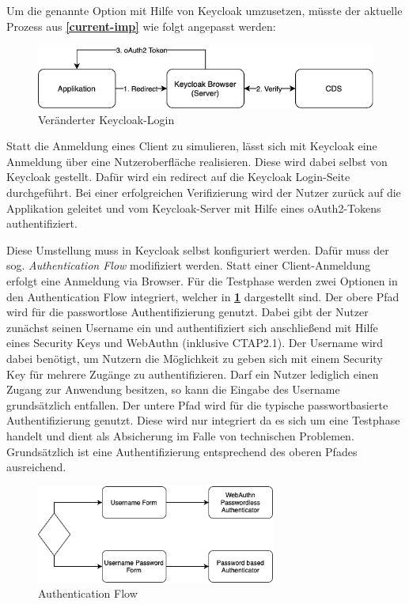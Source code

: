 Um die genannte Option mit Hilfe von Keycloak umzusetzen, müsste der aktuelle Prozess aus \textbf{\ref{current-imp}} wie folgt angepasst werden:

\begin{figure}[H]
	\centering 
	\includegraphics[width=1\textwidth]{img/abbildungen/keycloak_browser.png}
	\captionsetup{format=hang}
	\caption{Veränderter Keycloak-Login}
\end{figure}

Statt die Anmeldung eines Client zu simulieren, lässt sich mit  Keycloak eine Anmeldung über eine Nutzeroberfläche realisieren. Diese wird dabei selbst von Keycloak gestellt. Dafür wird ein redirect auf die Keycloak Login-Seite durchgeführt. Bei einer erfolgreichen Verifizierung wird der Nutzer zurück auf die Applikation geleitet und vom Keycloak-Server mit Hilfe eines oAuth2-Tokens authentifiziert. 

Diese Umstellung muss in Keycloak selbst konfiguriert werden. Dafür muss der sog. \textit{Authentication Flow} modifiziert werden. Statt einer Client-Anmeldung erfolgt eine Anmeldung via Browser. Für die Testphase werden zwei Optionen in den Authentication Flow integriert, welcher in \textbf{\ref{auth-flow}} dargestellt sind. Der obere Pfad wird für die passwortlose Authentifizierung genutzt. Dabei gibt der Nutzer zunächst seinen Username ein und authentifiziert sich anschließend mit Hilfe eines Security Keys und WebAuthn (inklusive CTAP2.1). Der Username wird dabei benötigt, um Nutzern die Möglichkeit zu geben sich mit einem Security Key für mehrere Zugänge zu authentifizieren. Darf ein Nutzer lediglich einen Zugang zur Anwendung besitzen, so kann die Eingabe des Username grundsätzlich entfallen. Der untere Pfad wird für die typische passwortbasierte Authentifizierung genutzt. Diese wird nur integriert da es sich um eine Testphase handelt und dient als Absicherung im Falle von technischen Problemen. Grundsätzlich ist eine Authentifizierung entsprechend des oberen Pfades ausreichend.

\begin{figure}[H]
	\centering 
	\includegraphics[width=0.7\textwidth]{img/abbildungen/authentication_flow.png}
	\captionsetup{format=hang}
	\caption{Authentication Flow} \label{auth-flow}
\end{figure}

